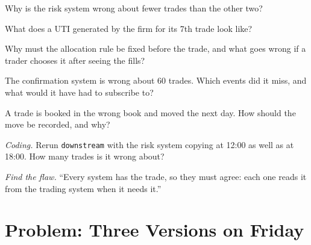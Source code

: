 \begin{exercise}[$\star$]\label{exo:pl:trade-capture-and-booking:2}
Why is the risk system wrong about fewer trades than the other two?
\end{exercise}

\begin{exercise}[$\star$]\label{exo:pl:trade-capture-and-booking:3}
What does a UTI generated by the firm for its 7th trade look like?
\end{exercise}

\begin{exercise}[$\star\star$]\label{exo:pl:trade-capture-and-booking:4}
Why must the allocation rule be fixed before the trade, and what goes wrong if a trader chooses it after seeing the fills?
\end{exercise}

\begin{exercise}[$\star\star$]\label{exo:pl:trade-capture-and-booking:5}
The confirmation system is wrong about 60 trades. Which events did it miss, and what would it have had to subscribe to?
\end{exercise}

\begin{exercise}[$\star\star$]\label{exo:pl:trade-capture-and-booking:6}
A trade is booked in the wrong book and moved the next day. How should the move be recorded, and why?
\end{exercise}

\begin{exercise}[$\star\star\star$]\label{exo:pl:trade-capture-and-booking:7}
\emph{Coding.} Rerun \texttt{downstream} with the risk system copying at 12:00 as well as at 18:00. How many trades is it wrong about?
\end{exercise}

\begin{exercise}[$\star\star\star$]\label{exo:pl:trade-capture-and-booking:8}
\emph{Find the flaw.} ``Every system has the trade, so they must agree: each one reads it from the trading system when it needs it.''
\end{exercise}

\section{Problem: Three Versions on Friday}


